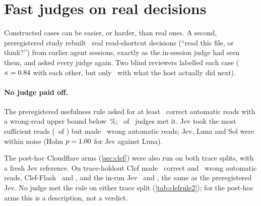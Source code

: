 \section{Fast judges on real decisions}\label{sec:traces}

Constructed cases can be easier, or harder, than real ones. A second, preregistered study rebuilt \TrN\ real
read-shortcut decisions (``read this file, or think?'') from earlier agent sessions, exactly as the in-session
judge had seen them, and asked every judge again. Two blind reviewers labelled each case
($\kappa = 0.84$ with each other, but only \TrKappaOutcome\ with what the host actually did next).

\begin{table}[htbp]
\centering\scriptsize
\caption{Real decisions, holdout \prereg: \TrN\ cases. ``Correct reads'' counts correct automatic reads among
the \TrReadCases\ cases whose label is a read.}
\label{tab:jbtrace}

\end{table}

\paragraph{No judge paid off.} The preregistered usefulness rule asked for at least \TrUsefulMinReads\ correct
automatic reads with a wrong-read upper bound below \TrUsefulMaxUpperPct\,\%; \TrNUseful\ of \NumBase\ judges met
it. Jev took the most sufficient reads (\TrJevReads\ of \TrReadCases) but made \TrJevWaK\ wrong automatic reads;
Jev, Luna and Sol were within noise (Holm $p = 1.00$ for Jev against Luna).

The post-hoc Cloudflare arms (\cref{sec:clef}) were also run on both trace splits, with a fresh Jev reference. On
trace-holdout Clef made \ClTrHoldClefReads\ correct and \ClTrHoldClefReadWa\ wrong automatic reads, Clef-Flash
\ClTrHoldFlashReads\ and \ClTrHoldFlashReadWa, and the in-run Jev \ClTrHoldJevReads\ and \ClTrHoldJevReadWa, the same as
the preregistered Jev. No judge met the rule on either trace split (\cref{tab:clefrule2}); for the post-hoc arms this is
a description, not a verdict.

\begin{table}[htbp]
\centering\small
\caption{Rule 2 (``useful'' read shortcut) on both trace splits for the post-hoc run: correct automatic reads among
the read-labelled cases, wrong automatic reads among all cases, and the 95\,\% Wilson upper bound of the wrong-read
rate (the rule needs at least \TrUsefulMinReads\ correct reads and an upper bound below \TrUsefulMaxUpperPct\,\%).}
\label{tab:clefrule2}

\end{table}

